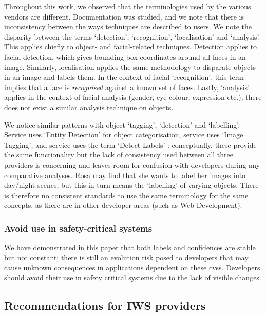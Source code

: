 Throughout this work, we observed that the terminologies used by the various vendors are different. Documentation was studied, and we note that there is inconsistency between the ways techniques are described to users. We note the disparity between the terms `detection', `recognition', `localisation' and `analysis'. This applies chiefly to object- and facial-related techniques. Detection applies to facial detection, which gives bounding box coordinates around all faces in an image. Similarly, localisation applies the same methodology to disparate objects in an image and labels them. In the context of facial `recognition', this term implies that a face is \textit{recognised} against a known set of faces. Lastly, `analysis' applies in the context of facial analysis (gender, eye colour, expression etc.); there does not exist a similar analysis technique on objects.

We notice similar patterns with object `tagging', `detection' and `labelling'. Service \googleapi{} uses `Entity Detection' for object categorisation, service \azureapi{} uses `Image Tagging', and service \awsapi{} uses the term `Detect Labels' : conceptually, these provide the same functionality but the lack of consistency used between all three providers is concerning and leaves room for confusion with developers during any comparative analyses. Rosa may find that she wants to label her images into day/night scenes, but this in turn means the `labelling' of varying objects. There is therefore no consistent standards to use the same terminology for the same concepts, as there are in other developer areas (such as Web Development).

\subsubsection{Avoid use in safety-critical systems}
 We have demonstrated in this paper that both labels and confidences are stable but not constant; there is still an evolution risk posed to developers that may cause unknown consequences in applications dependent on these \glspl{cvs}. Developers should avoid their use in safety critical systems due to the lack of visible changes.
 
\subsection{Recommendations for IWS providers}

